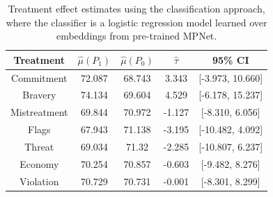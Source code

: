 \documentclass{article}
\begin{document}
\begin{table}[!ht]
    \centering
    \begin{tabular}{c|cccc}
        \toprule
        Treatment & $\hat{\mu}(P_1)$ & $\hat{\mu}(P_0)$ & $\hat{\tau}$ & 95\% CI \\
        \midrule
        Commitment & 72.087 & 68.743 & \textcolor{green!50!black}{3.343} & [-3.973, 10.660] \\
        Bravery & 74.134 & 69.604 & \textcolor{green!50!black}{4.529} & [-6.178, 15.237] \\
        Mistreatment & 69.844 & 70.972 & \textcolor{red!80!black}{-1.127} & [-8.310, 6.056] \\
        Flags & 67.943 & 71.138 & \textcolor{red!80!black}{-3.195} & [-10.482, 4.092] \\
        Threat & 69.034 & 71.32 & \textcolor{red!80!black}{-2.285} & [-10.807, 6.237]  \\
        Economy & 70.254 & 70.857 & \textcolor{red!80!black}{-0.603} & [-9.482, 8.276] \\
        Violation & 70.729 & 70.731 & \textcolor{red!80!black}{-0.001} & [-8.301, 8.299] \\
        \bottomrule
    \end{tabular}
    \caption{Treatment effect estimates using the classification approach, where the classifier is a logistic regression model learned over embeddings from pre-trained MPNet.}
    \label{tab:results_clf_mpnet}
\end{table}

\end{document}
